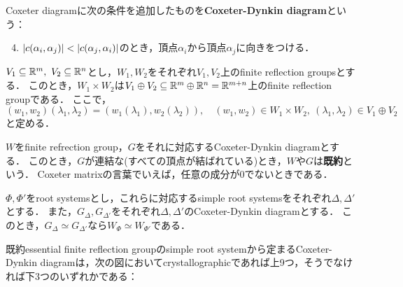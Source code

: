 \begin{definition}
  Coxeter diagramに次の条件を追加したものを\textbf{Coxeter-Dynkin diagram}という：
  \begin{enumerate}[label=(\roman*)]
    \setcounter{enumi}{3}
    \item $\left| c(\alpha_i, \alpha_j) \right| < \left| c(\alpha_j, \alpha_i) \right|$のとき，頂点$\alpha_i$から頂点$\alpha_j$に向きをつける．
  \end{enumerate}
\end{definition}

\begin{proposition}
  \label{prop:direct_prod_is_FRG}
  $V_1 \subseteq \mathbb{R}^m,\ V_2 \subseteq \mathbb{R}^n$とし，$W_1, W_2$をそれぞれ$V_1, V_2$上のfinite reflection groupsとする．
  このとき，$W_1 \times W_2$は$V_1 \oplus V_2 \subseteq \mathbb{R}^m \oplus \mathbb{R}^n = \mathbb{R}^{m+n}$上のfinite reflection groupである．
  ここで，
  \begin{equation}
    (w_1, w_2)(\lambda_1, \lambda_2) = (w_1(\lambda_1), w_2(\lambda_2)),\quad (w_1, w_2) \in W_1 \times W_2,\ (\lambda_1, \lambda_2) \in V_1 \oplus V_2
  \end{equation}
  と定める．
\end{proposition}

\begin{definition}
  \label{defi:irreducible}
  $W$をfinite refrection group，$G$をそれに対応するCoxeter-Dynkin diagramとする．
  このとき，$G$が連結な(すべての頂点が結ばれている)とき，$W$や$G$は\textbf{既約}という．
  Coxeter matrixの言葉でいえば，任意の成分が$0$でないときである．
\end{definition}

\begin{theorem}
  \label{thm:diag_is_simeq_implies_FRG_is_simeq}
  $\Phi, \Phi'$をroot systemsとし，これらに対応するsimple root systemsをそれぞれ$\Delta, \Delta'$とする．
  また，$G_\Delta, G_{\Delta'}$をそれぞれ$\Delta, \Delta'$のCoxeter-Dynkin diagramとする．
  このとき，$G_\Delta \simeq G_{\Delta'}$なら$W_\Phi \simeq W_{\Phi'}$である．
\end{theorem}

\begin{theorem}
  \label{thm:coxeter_diag_classification}
  既約essential finite reflection groupのsimple root systemから定まるCoxeter-Dynkin diagramは，次の図においてcrystallographicであれば上9つ，そうでなければ下3つのいずれかである：
\end{theorem}

